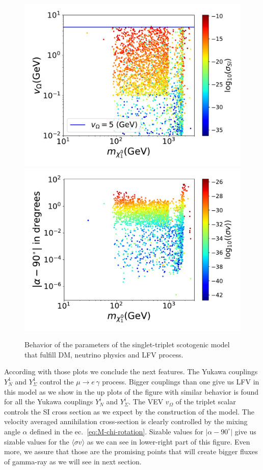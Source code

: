 \documentclass[12pt,letterpaper]{article}
\begin{document}
\begin{figure}
\begin{center}
\includegraphics[scale=0.4]{vT}
\includegraphics[scale=0.4]{alpha}
\caption{Behavior of the parameters of the singlet-triplet scotogenic model that fulfill DM, neutrino physics and LFV process.}
\label{fig:model-parameters}
\end{center}
\end{figure}
%
According with those plots we conclude the next features. The Yukawa couplings $Y_{N}^1$ and $Y_{\Sigma}^1$ control the $\mu\rightarrow e\,\gamma$ process. Bigger couplings than one give us LFV in this model as we show in the up plots of the figure with similar behavior is found for all the Yukawa couplings $Y_{N}^i$ and $Y_{\Sigma}^i$.
The VEV $v_{\Omega}$ of the triplet scalar controls the SI cross section as we expect by the construction of the model. 
The velocity averaged annihilation cross-section is clearly controlled by the mixing angle $\alpha$ defined in the ec.~\ref{eq:M-chi-rotation}. 
Sizable values for $|\alpha-90^{\circ}|$ give us sizable values for the $\langle\sigma v\rangle$ as we can see in lower-right part of this figure. Even more, we assure that those are the promising points that will create bigger fluxes of gamma-ray as we will see in next section.
\end{document}
